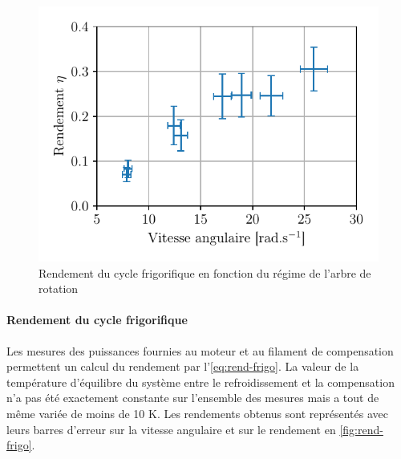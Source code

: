 \begin{minipage}{\linewidth}
    \begin{figure}
        \includegraphics[width=\linewidth]{figures/rend-frigo.pdf}
        \caption{Rendement du cycle frigorifique en fonction du régime de l'arbre de rotation}
        \label{fig:rend-frigo}
    \end{figure}

    \paragraph*{Rendement du cycle frigorifique}
    Les mesures des puissances fournies au moteur et au filament de compensation permettent un calcul du rendement par l'\autoref{eq:rend-frigo}. La valeur de la température d'équilibre du système entre le refroidissement et la compensation n'a pas été exactement constante sur l'ensemble des mesures mais a tout de même variée de moins de 10 \si{\kelvin}. Les rendements obtenus sont représentés avec leurs barres d'erreur sur la vitesse angulaire et sur le rendement en \autoref{fig:rend-frigo}.

\end{minipage}


